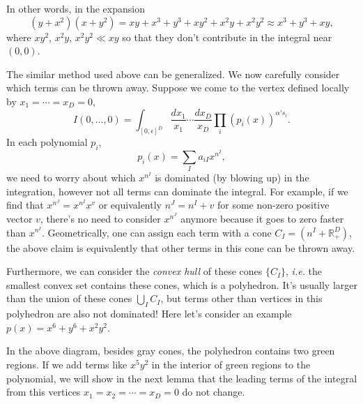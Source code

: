 \documentclass[12pt]{article}
\theoremstyle{definition}
\theoremstyle{plain}
\begin{document}
In other words, in the expansion 
\[
	(y+x^2)(x+y^2)=xy+x^3+y^3+xy^2+x^2y+x^2y^2\approx x^3+y^3+xy,
\]
where $xy^2$, $x^2y$, $x^2y^2\ll xy$ so that they don't contribute in the integral near $(0,0)$.


The similar method used above can be generalized. We now carefully consider which terms can be thrown away.
Suppose we come to the vertex defined locally by $x_1=\cdots=x_D=0$, 
\[
	I(0,\dots,0)=\int_{[0,\epsilon]^D} \frac{d x_1}{x_1}\cdots \frac{d x_D}{x_D} 
	\prod_i(p_i(x))^{\alpha' s_i}.
\]
In each polynomial $p_i$, 
\[
	p_i(x)=\sum_{I} a_{iI} x^{n^I},
\]
we need to worry about which $x^{n^I}$ is dominated (by blowing up) in the integration,
however not all terms can dominate 
the integral. For example, if we find that $x^{n^J}=x^{n^I}x^{v}$ or equivalently $n^J=n^I+v$ for some 
non-zero positive vector $v$, there's no need to consider $x^{n^J}$ anymore because it goes to zero faster 
than $x^{n^I}$. Geometrically, one can assign each term with a cone $C_{I}=(n^I+\mathbb R^D_{+})$, the above
claim is equivalently that other terms in this cone can be thrown away.

Furthermore, we can consider the \textit{convex hull} of these cones $\{C_I\}$, 
\textit{i.e.} the smallest convex set contains these cones,
which is a polyhedron. It's usually larger than
the union of these cones $\bigcup_I C_I$, but terms other than vertices in this polyhedron 
are also not dominated! Here let's consider an example $p(x)=x^6+y^6+x^2y^2$. 
\begin{center}
\end{center}
In the above diagram, besides gray cones, the polyhedron contains two green regions. 
If we add terms like $x^5y^2$ in the interior of green regions to the polynomial, 
we will show in the next lemma that the leading terms of the integral 
from this vertices $x_1=x_2=\cdots=x_D=0$ do not change.
\end{document}
